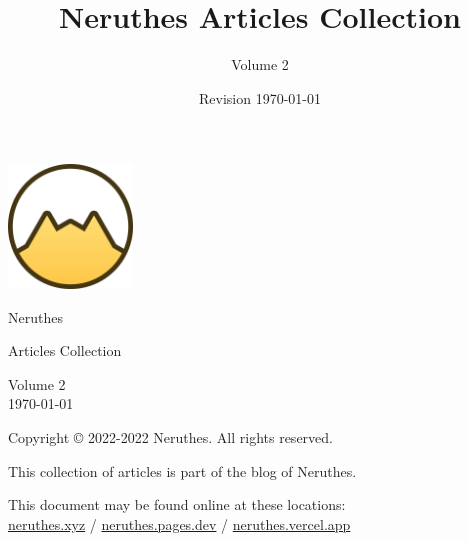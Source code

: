 \documentclass[12pt,a4paper]{report}
\title{Neruthes Articles Collection}
\author{Volume 2}
\date{Revision \today}
\begin{document}
\begin{titlepage}
	\center
	\sffamily
	\includegraphics[width=33mm]{wwwsrc/neruthes-forceCircle-unpadded.png}\par
	\vskip 110pt
    {\fontsize{30pt}{30pt}\selectfont Neruthes}\par\vskip 30pt
    {\LARGE Articles Collection}\par
	\vfill
	\normalsize
	Volume 2\\
	\today\par
\end{titlepage}
\pagestyle{plain}
\tableofcontents\clearpage





\rmfamily








\clearpage\pagestyle{empty}
\leavevmode\vfill
\small\sffamily
Copyright \copyright{} 2022-2022 Neruthes. All rights reserved.\par
This collection of articles is part of the blog of Neruthes.\par
This document may be found online at these locations:\\
\href{https://neruthes.xyz/articles/Neruthes_articles_vol002.pdf}{neruthes.xyz} /
\href{https://neruthes.pages.dev/articles/Neruthes_articles_vol002.pdf}{neruthes.pages.dev} /
\href{https://neruthes.vercel.app/articles/Neruthes_articles_vol002.pdf}{neruthes.vercel.app}
\end{document}
